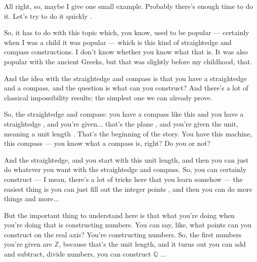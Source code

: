 \begin{speech}[00:38:09 - 00:39:59]
All right, so, maybe I give one small example. Probably there's enough time to do it. Let's try to do it quickly .

So, it has to do with this topic which, you know, used to be popular --- certainly when I was a child it was popular --- which is this kind of straightedge and compass constructions. I don't know whether you know what that is. It was also popular with the ancient Greeks, but that was slightly before my childhood, that.

And the idea with the straightedge and compass is that you have a straightedge and a compass, and the question is what can you construct? And there's a lot of classical impossibility results; the simplest one we can already prove.

So, the straightedge and compass: you have a compass like this  and you have a straightedge , and you're given... that's the plane , and you're given the unit, meaning a unit length . That's the beginning of the story. You have this machine, this compass --- you know what a compass is, right? Do you or not?

And the straightedge, and you start with this unit length, and then you can just do whatever you want with the straightedge and compass. So, you can certainly construct --- I mean, there's a lot of tricks here that you learn somehow --- the easiest thing is you can just fill out the integer points , and then you can do more things and more...

But the important thing to understand here is that what you're doing when you're doing that is constructing numbers. You can say, like, what points can you construct on the real axis? You're constructing numbers. So, the first numbers you're given are $\mathbb{Z}$, because that's the unit length, and it turns out you can add and subtract, divide numbers, you can construct $\mathbb{Q}$ ...
\end{speech}


